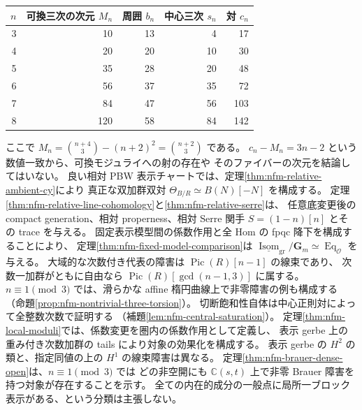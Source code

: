 \documentclass[11pt,a4paper]{ltjsarticle}
\numberwithin{equation}{section}
\newcommand{\C}{\mathbb C}
\begin{document}
\begin{center}
\begin{tabular}{r|r|r|r|r}
$n$&可換三次の次元 $M_n$&周囲 $b_n$&中心三次 $s_n$&対 $c_n$\\\hline
3&10&13&4&17\\
4&20&20&10&30\\
5&35&28&20&48\\
6&56&37&35&72\\
7&84&47&56&103\\
8&120&58&84&142
\end{tabular}
\end{center}
ここで $M_n=\binom{n+4}{3}-(n+2)^2=\binom{n+2}{3}$ である。
$c_n-M_n=3n-2$ という数値一致から、可換モジュライへの射の存在や
そのファイバーの次元を結論してはいない。
良い相対 PBW 表示チャートでは、定理\ref{thm:nfm-relative-ambient-cy}により
真正な双加群双対 $\Theta_{B/R}\simeq B(N)[-N]$ を構成する。
定理\ref{thm:nfm-relative-line-cohomology}と\ref{thm:nfm-relative-serre}は、
任意底変更後の compact generation、相対 properness、相対 Serre 関手
$S=(1-n)[n]$ とその trace を与える。
固定表示模型間の係数作用と全 Hom の fpqc 降下を構成することにより、
定理\ref{thm:nfm-fixed-model-comparison}は
$\underline{\operatorname{Isom}}_{\mathrm{gr}}/\mathbf G_m
\simeq\operatorname{Eq}_{\mathcal O}$ を与える。
大域的な次数付き代表の障害は $\operatorname{Pic}(R)[n-1]$ の線束であり、
次数一加群がともに自由なら $\operatorname{Pic}(R)[\gcd(n-1,3)]$ に属する。
$n\equiv1\pmod3$ では、滑らかな affine 楕円曲線上で非零障害の例も構成する
（命題\ref{prop:nfm-nontrivial-three-torsion}）。
切断飽和性自体は中心正則対によって全整数次数で証明する
（補題\ref{lem:nfm-central-saturation}）。
定理\ref{thm:nfm-local-moduli}では、係数変更を圏内の係数作用として定義し、
表示 gerbe 上の重み付き次数加群の tails により対象の効果化を構成する。
表示 gerbe の $H^2$ の類と、指定同値の上の $H^1$ の線束障害は異なる。
定理\ref{thm:nfm-brauer-dense-open}は、$n\equiv1\pmod3$ では
どの非空開にも $\C(s,t)$ 上で非零 Brauer 障害を持つ対象が存在することを示す。
全ての内在的成分の一般点に局所一ブロック表示がある、という分類は主張しない。
\end{document}
